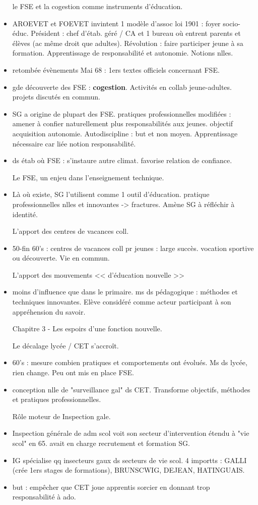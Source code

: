 \documentclass[12pt]{article}
\begin{document}
\begin{itemize}
le FSE et la cogestion comme instruments d'éducation.
\item AROEVET et FOEVET invintent 1 modèle d'assoc loi 1901 : foyer socio-éduc. Président : chef d'étab. géré / CA et 1 bureau où entrent parents et élèves (ac même droit que adultes). Révolution : faire participer jeune à sa formation. Apprentissage de responsabilité et autonomie. Notions nlles.
\item retombée évènements Mai 68 : 1ers textes officiels concernant FSE.
\item gde découverte des FSE : \textbf{cogestion}. Activités en collab jeune-adultes. projets discutés en commun.
\item SG a origine de plupart des FSE. pratiques professionnelles modifiées : amener à confier naturellement plus responsabilités aux jeunes. objectif acquisition autonomie. Autodiscipline : but et non moyen. Apprentissage nécessaire car liée notion responsabilité.
\item ds étab où FSE : s'instaure autre climat. favorise relation de confiance.

Le FSE, un enjeu dans l'enseignement technique.
\item Là où existe, SG l'utilisent comme 1 outil d'éducation. pratique professionnelles nlles et innovantes -> fractures. Amène SG à réfléchir à identité.

L'apport des centres de vacances coll.
\item 50-fin 60's : centres de vacances coll pr jeunes : large succès. vocation sportive ou découverte. Vie en commun.

L'apport des mouvements << d'éducation nouvelle >>
\item moins d'influence que dans le primaire. ms ds pédagogique : méthodes et techniques innovantes. Elève considéré comme acteur participant à son appréhension du savoir.

Chapitre 3 - Les espoirs d'une fonction nouvelle.

Le décalage lycée / CET s'accroît.
\item 60's : mesure combien pratiques et comportements ont évolués. Ms ds lycée, rien change. Peu ont mis en place FSE.
\item conception nlle de "surveillance gal" ds CET. Transforme objectifs, méthodes et pratiques professionnelles.

Rôle moteur de Inspection gale.
\item Inspection générale de adm scol voit son secteur d'intervention étendu à "vie scol" en 65. avait en charge recrutement et formation SG.
\item IG spécialise qq insecteurs gaux ds secteurs de vie scol. 4 importts : GALLI (crée 1ers stages de formations), BRUNSCWIG, DEJEAN, HATINGUAIS.
\item but : empêcher que CET joue apprentis sorcier en donnant trop responsabilité à ado.


\end{itemize}
\end{document}
